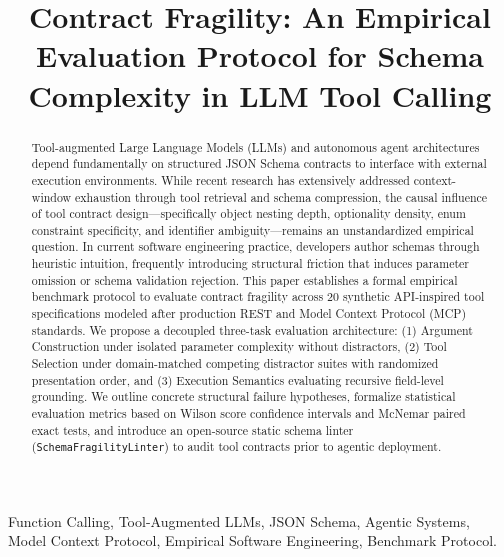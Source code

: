 \documentclass[10pt,conference]{IEEEtran}
\begin{document}
\title{Contract Fragility: An Empirical Evaluation Protocol for Schema Complexity in LLM Tool Calling}

\author{
}

\maketitle

\begin{abstract}
Tool-augmented Large Language Models (LLMs) and autonomous agent architectures depend fundamentally on structured JSON Schema contracts to interface with external execution environments. While recent research has extensively addressed context-window exhaustion through tool retrieval and schema compression, the causal influence of tool contract design---specifically object nesting depth, optionality density, enum constraint specificity, and identifier ambiguity---remains an unstandardized empirical question. In current software engineering practice, developers author schemas through heuristic intuition, frequently introducing structural friction that induces parameter omission or schema validation rejection. This paper establishes a formal empirical benchmark protocol to evaluate contract fragility across 20 synthetic API-inspired tool specifications modeled after production REST and Model Context Protocol (MCP) standards. We propose a decoupled three-task evaluation architecture: (1) Argument Construction under isolated parameter complexity without distractors, (2) Tool Selection under domain-matched competing distractor suites with randomized presentation order, and (3) Execution Semantics evaluating recursive field-level grounding. We outline concrete structural failure hypotheses, formalize statistical evaluation metrics based on Wilson score confidence intervals and McNemar paired exact tests, and introduce an open-source static schema linter (\texttt{SchemaFragilityLinter}) to audit tool contracts prior to agentic deployment.
\end{abstract}

\begin{IEEEkeywords}
Function Calling, Tool-Augmented LLMs, JSON Schema, Agentic Systems, Model Context Protocol, Empirical Software Engineering, Benchmark Protocol.
\end{IEEEkeywords}
\end{document}
